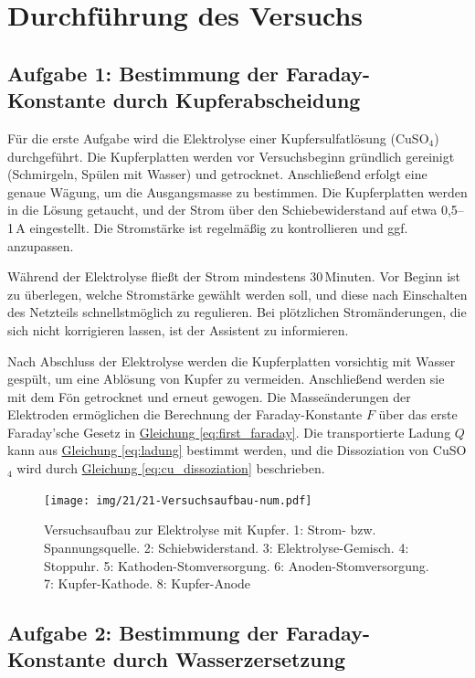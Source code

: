 \chapter{Durchführung des Versuchs}

\section*{Aufgabe 1: Bestimmung der Faraday-Konstante durch Kupferabscheidung}
Für die erste Aufgabe wird die Elektrolyse einer Kupfersulfatlösung (CuSO$_4$) durchgeführt. Die Kupferplatten werden vor Versuchsbeginn gründlich gereinigt (Schmirgeln, Spülen mit Wasser) und getrocknet. Anschließend erfolgt eine genaue Wägung, um die Ausgangsmasse zu bestimmen. Die Kupferplatten werden in die Lösung getaucht, und der Strom über den Schiebewiderstand auf etwa 0,5–1\,A eingestellt. Die Stromstärke ist regelmäßig zu kontrollieren und ggf. anzupassen.  

Während der Elektrolyse fließt der Strom mindestens 30\,Minuten. Vor Beginn ist zu überlegen, welche Stromstärke gewählt werden soll, und diese nach Einschalten des Netzteils schnellstmöglich zu regulieren. Bei plötzlichen Stromänderungen, die sich nicht korrigieren lassen, ist der Assistent zu informieren.  

Nach Abschluss der Elektrolyse werden die Kupferplatten vorsichtig mit Wasser gespült, um eine Ablösung von Kupfer zu vermeiden. Anschließend werden sie mit dem Fön getrocknet und erneut gewogen. Die Masseänderungen der Elektroden ermöglichen die Berechnung der Faraday-Konstante $F$ über das erste Faraday’sche Gesetz in \hyperref[eq:first_faraday]{Gleichung \ref*{eq:first_faraday}}. Die transportierte Ladung $Q$ kann aus \hyperref[eq:ladung]{Gleichung \ref*{eq:ladung}} bestimmt werden, und die Dissoziation von CuSO$_4$ wird durch \hyperref[eq:cu_dissoziation]{Gleichung \ref*{eq:cu_dissoziation}} beschrieben.
\begin{figure}[h!]
    \vspace{1.75cm}
    \texttt{[image: img/21/21-Versuchsaufbau-num.pdf]}
    \caption{Versuchsaufbau zur Elektrolyse mit Kupfer. 1: Strom- bzw. Spannungsquelle. 2: Schiebwiderstand. 3: Elektrolyse-Gemisch. 4: Stoppuhr. 5: Kathoden-Stomversorgung. 6: Anoden-Stomversorgung. 7: Kupfer-Kathode. 8: Kupfer-Anode}
    \label{fig:log_gezeichnet}
\end{figure}


\section*{Aufgabe 2: Bestimmung der Faraday-Konstante durch Wasserzersetzung}

